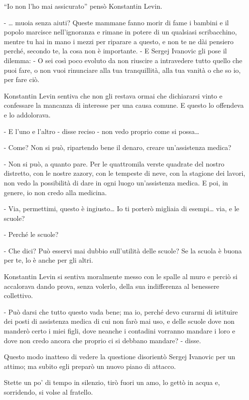 ``Io non l'ho mai assicurato'' pensò Konstantin Levin. 

- \ldots{} muoia senza aiuti? Queste mammane fanno morir di fame i bambini e il popolo marcisce nell'ignoranza e rimane in potere di un qualsiasi scribacchino, mentre tu hai in mano i mezzi per riparare a questo, e non te ne dài pensiero perché, secondo te, la cosa non è importante. - E Sergej Ivanovic gli pose il dilemma: - O sei così poco evoluto da non riuscire a intravedere tutto quello che puoi fare, o non vuoi rinunciare alla tua tranquillità, alla tua vanità o che so io, per fare ciò. 

Konstantin Levin sentiva che non gli restava ormai che dichiararsi vinto e confessare la mancanza di interesse per una causa comune. E questo lo offendeva e lo addolorava. 

- E l'uno e l'altro - disse reciso - non vedo proprio come si possa\ldots{} 

- Come? Non si può, ripartendo bene il denaro, creare un'assistenza medica? 

- Non si può, a quanto pare. Per le quattromila verste quadrate del nostro distretto, con le nostre zazory, con le tempeste di neve, con la stagione dei lavori, non vedo la possibilità di dare in ogni luogo un'assistenza medica. E poi, in genere, io non credo alla medicina. 

- Via, permettimi, questo è ingiusto\ldots{} Io ti porterò migliaia di esempi\ldots{} via, e le scuole? 

- Perché le scuole? 

- Che dici? Può esservi mai dubbio sull'utilità delle scuole? Se la scuola è buona per te, lo è anche per gli altri. 

Konstantin Levin si sentiva moralmente messo con le spalle al muro e perciò si accalorava dando prova, senza volerlo, della sua indifferenza al benessere collettivo. 

- Può darsi che tutto questo vada bene; ma io, perché devo curarmi di istituire dei posti di assistenza medica di cui non farò mai uso, e delle scuole dove non manderò certo i miei figli, dove neanche i contadini vorranno mandare i loro e dove non credo ancora che proprio ci si debbano mandare? - disse. 

Questo modo inatteso di vedere la questione disorientò Sergej Ivanovic per un attimo; ma subito egli preparò un nuovo piano di attacco. 

Stette un po' di tempo in silenzio, tirò fuori un amo, lo gettò in acqua e, sorridendo, si volse al fratello. 

